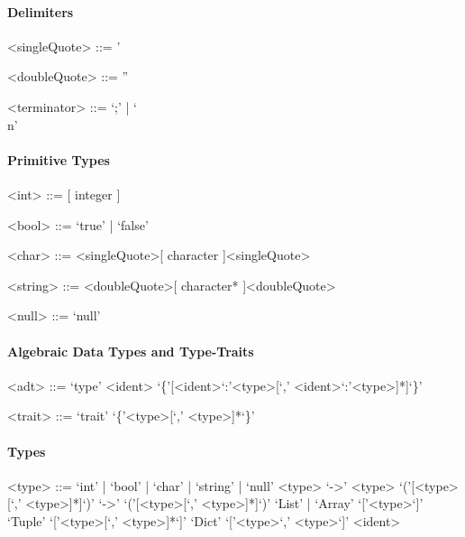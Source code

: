 \documentclass[11pt]{article} %
\begin{document}
\paragraph{Delimiters}

\begin{grammar}

<singleQuote> ::= '

<doubleQuote> ::= ''

<terminator> ::= `;' | `\\n'

\end{grammar}

\paragraph{Primitive Types}

\begin{grammar}

<int> ::= [ integer ]

<bool> ::= `true' | `false'

<char> ::= <singleQuote>[ character ]<singleQuote>

<string> ::= <doubleQuote>[ character* ]<doubleQuote>

<null> ::= `null'

\end{grammar}

\paragraph{Algebraic Data Types and Type-Traits}

\begin{grammar}

<adt> ::= `type' <ident> `\{'[<ident>`:'<type>[`,' <ident>`:'<type>]*]`\}'

<trait> ::= `trait' `\{'<type>[`,' <type>]*`\}'

\end{grammar}

\paragraph{Types}

\begin{grammar}

<type> ::= `int' | `bool' | `char' | `string' | `null'
\alt <type> `->' <type>
\alt `('[<type>[`,' <type>]*]`)' `->' `('[<type>[`,' <type>]*]`)'
\alt `List' | `Array' `['<type>`]'
\alt `Tuple' `['<type>[`,' <type>]*`]'
\alt `Dict' `['<type>`,' <type>`]'
\alt <ident>

\end{grammar}
\end{document}
